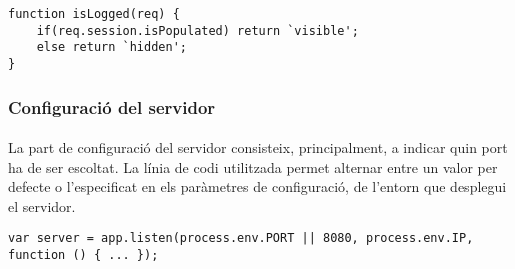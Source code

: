     \begin{lstlisting}[style=rawOwn,caption={Funció per decidir si cal mostrar el botó de desconnexió}]
function isLogged(req) {
    if(req.session.isPopulated) return `visible';
    else return `hidden';
}
    \end{lstlisting}


    \subsubsection{Configuració del servidor}

    \paragraph{}
    La part de configuració del servidor consisteix, principalment, a indicar quin port ha de ser escoltat. La línia de codi utilitzada permet alternar entre un valor per defecte o l'especificat en els paràmetres de configuració, de l'entorn que desplegui el servidor.

    \begin{lstlisting}[style=rawOwn,caption={Configuració del servidor}]
var server = app.listen(process.env.PORT || 8080, process.env.IP, function () { ... });
    \end{lstlisting}
